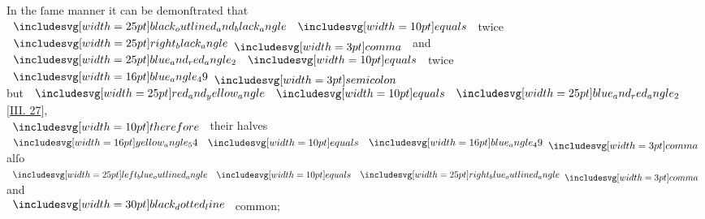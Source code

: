 \documentclass[12pt,preview]{standalone}
\begin{document}
\begin{minipage}[t]{0.64\textwidth}
    \hfill

    \begin{center}
        In the ſame manner it can be demonſtrated that\\
        $\img{black_outlined_and_black_angle} \bequals$ twice $\img{right_black_angle} \bcomma$ and $\img{blue_and_red_angle_2} \bequals$ twice $\img[0][0][16]{blue_angle_49} \bsemicolon$\\
        but $\img{red_and_yellow_angle} \bequals \img{blue_and_red_angle_2}$ [\hyperref[book3pr27]{\textsc{III.} 27}],\\
        $\btherefore$ their halves $\img[0][0][16]{yellow_angle_54} \bequals \img[0][0][16]{blue_angle_49} \bcomma$ alſo $\img{left_blue_outlined_angle} \bequals \img{right_blue_outlined_angle} \bcomma$ and\\
        $\dottedblackline$ common;
    \end{center}
\end{minipage}%
\hfill
\begin{minipage}[t]{0.33\textwidth}
    \vspace{40pt}
    
\end{minipage}%

\newpage
\end{document}
